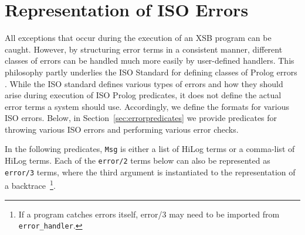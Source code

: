 \section{Representation of ISO Errors} \label{sec:iso-errors}

All exceptions that occur during the execution of an XSB program can
be caught.  However, by structuring error terms in a consistent
manner, different classes of errors can be handled much more easily by
user-defined handlers.  This philosophy partly underlies the ISO
Standard for defining classes of Prolog errors \cite{ISO-Prolog}.
While the ISO standard defines various types of errors and how they
should arise during execution of ISO Prolog predicates, it does not
define the actual error terms a system should use.  Accordingly, we
define the formats for various ISO errors.  Below, in
Section~\ref{sec:errorpredicates} we provide predicates for throwing
various ISO errors and performing various error checks.

In the following predicates, {\tt Msg} is either a list of HiLog terms
or a comma-list of HiLog terms.  Each of the {\tt error/2} terms below
can also be represented as {\tt error/3} terms, where the third
argument is instantiated to the representation of a
backtrace~\footnote{If a program catches errors itself, error/3 may
  need to be imported from {\tt error\_handler}.}.

